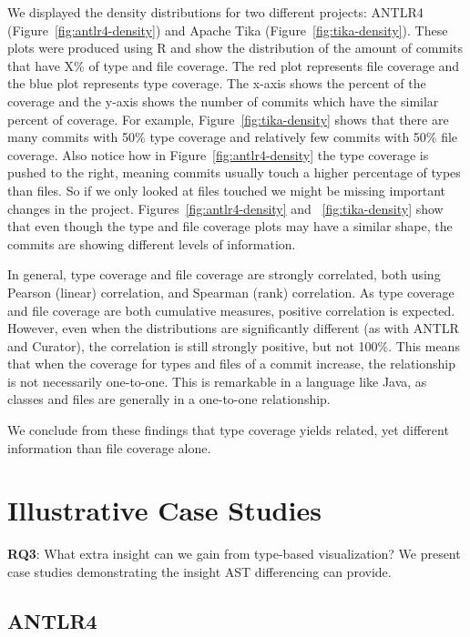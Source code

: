 We displayed the density distributions for two different projects: ANTLR4 (Figure~\ref{fig:antlr4-density}) and Apache Tika (Figure~\ref{fig:tika-density}). These plots were produced using R and show the distribution of the amount of commits that have X\% of type and file coverage. The red plot represents file coverage and the blue plot represents type coverage. The x-axis shows the percent of the coverage and the y-axis shows the number of commits which have the similar percent of coverage. For example, Figure~\ref{fig:tika-density} shows that there are many commits with 50\% type coverage and relatively few commits with 50\% file coverage. Also notice how in Figure~\ref{fig:antlr4-density} the type coverage is pushed to the right, meaning commits usually touch a higher percentage of types than files. So if we only looked at files touched we might be missing important changes in the project. Figures~\ref{fig:antlr4-density} and ~\ref{fig:tika-density} show that even though the type and file coverage plots may have a similar shape, the commits are showing different levels of information. 

In general, type coverage and file coverage are strongly correlated, both using Pearson (linear) correlation, and Spearman (rank) correlation. As type coverage and file coverage are both cumulative measures, positive correlation is expected. However, even when the distributions are significantly different (as with ANTLR and Curator), the correlation is still strongly positive, but not 100\%. This means that when the coverage for types and files of a commit increase, the relationship is not necessarily one-to-one. This is remarkable in a language like Java, as classes and files are generally in a one-to-one relationship.

We conclude from these findings that type coverage yields related, yet different information than file coverage alone.

\section{Illustrative Case Studies}
\label{sec:cases}

\textbf{RQ3}: What extra insight can we gain from type-based visualization? We present case studies demonstrating the insight AST differencing can provide.

\subsection{ANTLR4}\label{sec:antlr4}

